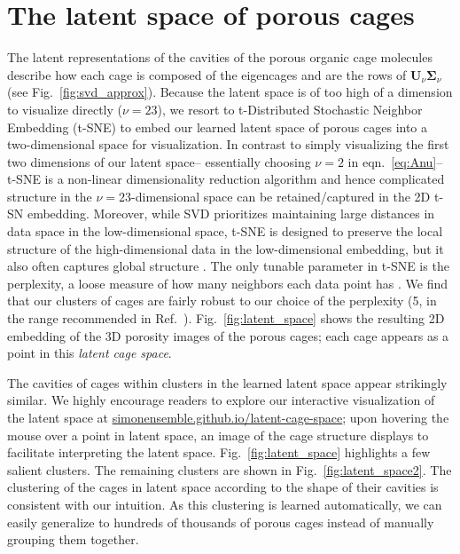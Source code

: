 \documentclass[journal=jacsat,manuscript=article,layout=traditional]{achemso}
\begin{document}
\section{The latent space of porous cages} 
The latent representations of the cavities of the porous organic cage molecules describe how each cage is composed of the eigencages and are the rows of $\mathbf{U}_\nu \mathbf{\Sigma}_\nu$ (see Fig.~\ref{fig:svd_approx}). Because the latent space is of too high of a dimension to visualize directly ($\nu=23$), we resort to t-Distributed Stochastic Neighbor Embedding (t-SNE) \cite{maaten2008visualizing,wattenberg2016how} to embed our learned latent space of porous cages into a two-dimensional space for visualization. 
{\color{red} In contrast to simply visualizing the first two dimensions of our latent space-- essentially choosing $\nu=2$ in eqn.~\ref{eq:Anu}-- t-SNE is a non-linear dimensionality reduction algorithm and hence complicated structure in the $\nu=23$-dimensional space can be retained/captured in the 2D t-SN embedding. Moreover, while  SVD prioritizes maintaining large distances in data space in the low-dimensional space, t-SNE is designed to preserve the local structure of the high-dimensional data in the low-dimensional embedding, but it also often captures global structure \cite{maaten2008visualizing}. 
The only tunable parameter in t-SNE is the perplexity, a loose measure of how many neighbors each data point has \cite{maaten2008visualizing,wattenberg2016how}. We find that our clusters of cages are fairly robust to our choice of the perplexity (5, in the range recommended in Ref.~\cite{maaten2008visualizing}).
} Fig.~\ref{fig:latent_space} shows the resulting 2D embedding of the 3D porosity images of the porous cages; each cage appears as a point in this \emph{latent cage space}.

The cavities of cages within clusters in the learned latent space appear strikingly similar.
We highly encourage readers to explore our interactive visualization of the latent space at \url{simonensemble.github.io/latent-cage-space}; upon hovering the mouse over a point in latent space, an image of the cage structure displays to facilitate interpreting the latent space. Fig.~\ref{fig:latent_space} highlights a few salient clusters. The remaining clusters are shown in Fig.~\ref{fig:latent_space2}. The clustering of the cages in latent space according to the shape of their cavities is consistent with our intuition. As this clustering is learned automatically, we can easily generalize to hundreds of thousands of porous cages instead of manually grouping them together. 
\end{document}
